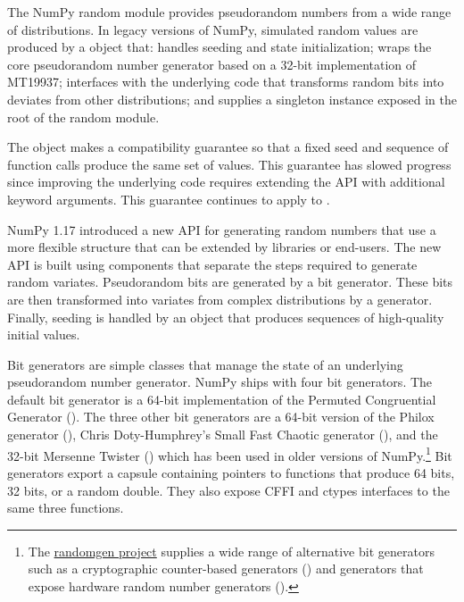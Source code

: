 The NumPy random module provides pseudorandom numbers from a wide range of
distributions. In legacy versions of NumPy, simulated random values are produced
by a  object that: handles seeding and state initialization;
wraps the core pseudorandom number generator based on a 32-bit implementation of
MT19937; interfaces with the underlying code that transforms random bits into
deviates from other distributions; and supplies a singleton instance exposed in
the root of the random module.

The  object makes a compatibility guarantee so that a fixed
seed and sequence of function calls produce the same set of values. This
guarantee has slowed progress since improving the underlying code requires
extending the API with additional keyword arguments. This guarantee continues to
apply to . 


NumPy 1.17 introduced a new API for generating random numbers that use a more
flexible structure that can be extended by libraries or end-users. The new API
is built using components that separate the steps required to generate random
variates. Pseudorandom bits are generated by a bit generator. These bits are
then transformed into variates from complex distributions by a generator.
Finally, seeding is handled by an object that produces sequences of high-quality
initial values.

Bit generators are simple classes that manage the state of an underlying
pseudorandom number generator. NumPy ships with four bit generators. The default
bit generator is a 64-bit implementation of the Permuted Congruential Generator
\cite{pcg64} (). The three other bit generators are a 64-bit version
of the Philox generator\cite{random123} (), Chris Doty-Humphrey's
Small Fast Chaotic generator\cite{practrand} (), and the 32-bit
Mersenne Twister\cite{mt19937} () which has been used in older
versions of NumPy.\footnote{The
\href{https://github.com/bashtage/randomgen}{randomgen project} supplies a wide
range of alternative bit generators such as a cryptographic counter-based
generators () and generators that expose hardware random number
generators ()\cite{randomgen}.} Bit generators export a capsule
containing pointers to functions that produce 64 bits, 32 bits, or a random
double. They also expose CFFI and ctypes interfaces to the same three functions.

